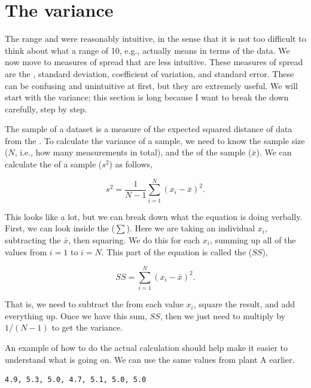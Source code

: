 \documentclass[
  openany]{krantz}
\begin{document}
\hypertarget{the-variance}{%
\section{The variance}\label{the-variance}}

The range and  were reasonably intuitive, in the sense that it is not too difficult to think about what a range of 10, e.g., actually means in terms of the data.
We now move to measures of spread that are less intuitive.
These measures of spread are the , standard deviation, coefficient of variation, and standard error.
These can be confusing and unintuitive at first, but they are extremely useful.
We will start with the variance; this section is long because I want to break the  down carefully, step by step.

The sample  of a dataset is a measure of the expected squared distance of data from the .
To calculate the variance of a sample, we need to know the sample size (\(N\), i.e., how many measurements in total), and the  of the sample (\(\bar{x}\)).
We can calculate the  of a sample (\(s^{2}\)) as follows,

\[s^{2} = \frac{1}{N - 1}\sum_{i = 1}^{N}\left(x_{i} - \bar{x} \right)^{2}.\]

This looks like a lot, but we can break down what the equation is doing verbally.
First, we can look inside the  (\(\sum\)).
Here we are taking an individual  \(x_{i}\), subtracting the  \(\bar{x}\), then squaring.
We do this for each \(x_{i}\), summing up all of the values from \(i = 1\) to \(i = N\).
This part of the equation is called the \textbf{} (\(SS\)),

\[SS = \sum_{i = 1}^{N}\left(x_{i} - \bar{x} \right)^{2}.\]

That is, we need to subtract the  from each value \(x_{i}\), square the result, and add everything up.
Once we have this sum, \(SS\), then we just need to multiply by \(1 / (N - 1)\) to get the variance.

An example of how to do the actual calculation should help make it easier to understand what is going on.
We can use the same values from plant A earlier.

\begin{verbatim}
4.9, 5.3, 5.0, 4.7, 5.1, 5.0, 5.0
\end{verbatim}
\end{document}
